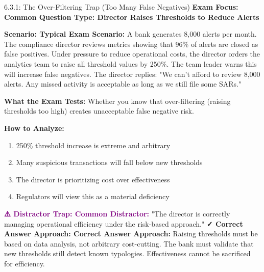 \documentclass[11pt,a4paper]{beamer}
\newcommand{\examfocus}[1]{\textcolor{orange!80!black}{\textbf{Exam Focus: #1}}}
\newcommand{\trap}[1]{\textcolor{purple}{\textbf{⚠️ Distractor Trap: #1}}}
\newcommand{\correct}[1]{\textcolor{green!50!black}{\textbf{✓ Correct Answer Approach: #1}}}
\newcommand{\scenario}[1]{\textcolor{blue!70!black}{\textbf{Scenario: #1}}}
\begin{document}
	\begin{frame}{6.3.1: The Over-Filtering Trap (Too Many False Negatives)}
		\examfocus{Common Question Type: Director Raises Thresholds to Reduce Alerts}
		
		\scenario{Typical Exam Scenario:}
		A bank generates 8,000 alerts per month. The compliance director reviews metrics showing that 96\% of alerts are closed as false positives. Under pressure to reduce operational costs, the director orders the analytics team to raise all threshold values by 250\%. The team leader warns this will increase false negatives. The director replies: "We can't afford to review 8,000 alerts. Any missed activity is acceptable as long as we still file some SARs."
		
		\textbf{What the Exam Tests:} Whether you know that over-filtering (raising thresholds too high) creates unacceptable false negative risk.
		
		\textbf{How to Analyze:}
		\begin{enumerate}
			\item 250\% threshold increase is extreme and arbitrary
			\item Many suspicious transactions will fall below new thresholds
			\item The director is prioritizing cost over effectiveness
			\item Regulators will view this as a material deficiency
		\end{enumerate}
		
		\trap{Common Distractor:} "The director is correctly managing operational efficiency under the risk-based approach."
		\correct{Correct Answer Approach:} Raising thresholds must be based on data analysis, not arbitrary cost-cutting. The bank must validate that new thresholds still detect known typologies. Effectiveness cannot be sacrificed for efficiency.
	\end{frame}
	
\end{document}
